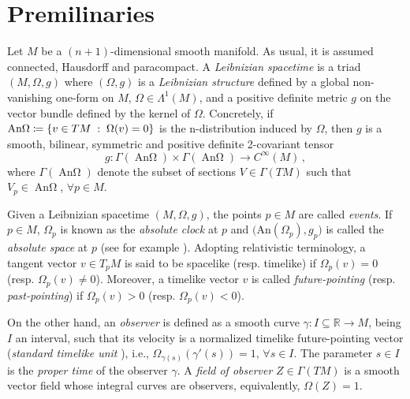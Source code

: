 \documentclass[12pt]{article}
\newcommand{\coloneq}{\vcentcolon\mathrel{\mkern -1.2mu}\mathrel{=}}
\DeclareMathOperator{\An}{\text{An}\Omega}
\def\R{\mathbb R}
\begin{document}
\section{Premilinaries}
Let $M$ be a $(n+1)$-dimensional smooth manifold. As usual, it is assumed connected, Hausdorff and paracompact.
A \textit{Leibnizian spacetime} \cite{Bernal} is a triad $(M,\Omega, g)$ where $(\Omega, g)$ is a {\it Leibnizian structure} defined by a global non-vanishing one-form on $M$, $\Omega\in \Lambda^1(M)$, and a positive definite metric $g$ on the vector bundle defined by the kernel of $\Omega$. Concretely, if $\An \coloneq \{ v\in TM \; : \; \Omega(v) = 0 \}$ is the n-distribution induced by $\Omega$, then $g$ is a smooth, bilinear, symmetric and positive definite 2-covariant tensor
\begin{equation*}
    g\colon \Gamma(\An) \times \Gamma(\An) \to C^\infty(M)\,,
\end{equation*}
where $\Gamma(\An)$ denote the subset of sections $V\in \Gamma(TM)$ such that $V_p\in \An$, $\forall p\in M$. 

Given a Leibnizian spacetime $(M,\Omega,g)$, the points $p\in M$ are called \textit{events}. If $p\in M$, $\Omega_p$ is known as the \textit{absolute clock} at $p$ and $\big(\text{An} (\Omega_p), g_p\big)$ is called the \textit{absolute space} at $p$ (see for example \cite{Bernal2}). Adopting relativistic terminology, a tangent vector $v\in T_pM$ is said to be spacelike (resp. timelike) if $\Omega_p(v)=0$ (resp. $\Omega_p(v)\ne 0$). Moreover, a timelike vector $v$ is called {\it future-pointing} (resp. {\it past-pointing}) if $\Omega_p(v)>0$ (resp. $\Omega_p(v)<0$). 

On the other hand, an {\it observer} is defined as a smooth curve $\gamma\colon I\subseteq \R \to M$, being $I$ an interval, such that its velocity is a normalized timelike future-pointing vector ({\it standard timelike unit} \cite{Bernal2}), i.e., $\Omega_{\gamma(s)}(\gamma'(s)) = 1,\, \forall s\in I$. The parameter $s\in I$ is the {\it proper time} of the observer $\gamma$. A \textit{field of observer} $Z\in \Gamma(TM)$ is a smooth vector field whose integral curves are observers, equivalently, $\Omega(Z)=1$. 
\end{document}

